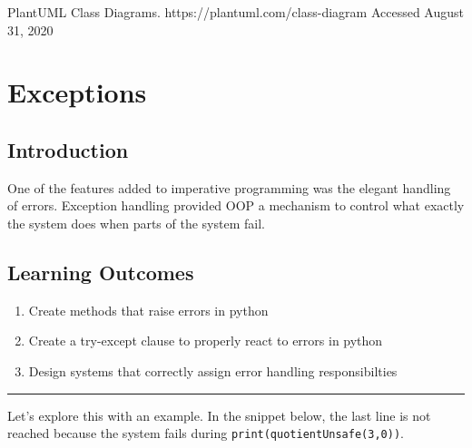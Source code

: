 PlantUML Class Diagrams. https://plantuml.com/class-diagram Accessed
August 31, 2020

\chapter{Exceptions}\label{exceptions.md__exceptions}

\section{Introduction}\label{exceptions.md__introduction}

One of the features added to imperative programming was the elegant
handling of errors. Exception handling provided OOP a mechanism to
control what exactly the system does when parts of the system fail.

\section{Learning Outcomes}\label{exceptions.md__learning-outcomes}

\begin{enumerate}
\def\labelenumi{\arabic{enumi}.}
\tightlist
\item
  Create methods that raise errors in python
\item
  Create a try-except clause to properly react to errors in python
\item
  Design systems that correctly assign error handling responsibilties
\end{enumerate}

\begin{center}\rule{0.5\linewidth}{0.5pt}\end{center}

Let's explore this with an example. In the snippet below, the last line
is not reached because the system fails during
\texttt{print(quotientUnsafe(3,0))}.

\begin{Shaded}
\begin{Highlighting}[]
\NormalTok{) }\OperatorTok{{-}\textgreater{}} \NormalTok{:}
    \OperatorTok{/}

\NormalTok{,}\NormalTok{))}
\NormalTok{,}\NormalTok{))}
\NormalTok{(}\NormalTok{)}
\end{Highlighting}
\end{Shaded}

